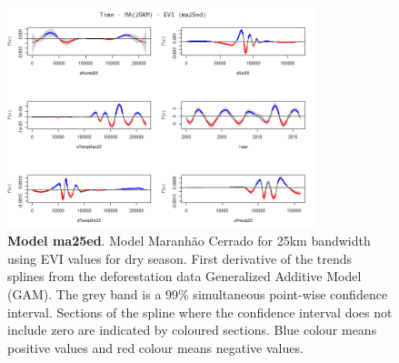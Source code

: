 \begin{table}

\begin{figure}[H]
 \centering
        \centering
        \includegraphics[width=0.8\textwidth]{ma25ed.png} %
        \caption[Model Cerrado Maranhão for 25km bandwidth using EVI values for dry season. First derivative of the trends splines from the deforestation data Generalized Additive Model (GAM)]{\textbf{Model ma25ed}. Model Maranhão Cerrado for 25km bandwidth using EVI values for dry season. First derivative of the trends splines from the deforestation data Generalized Additive Model (GAM). The grey band is a 99\% simultaneous point-wise confidence interval. Sections of the spline where the confidence interval does not include zero are indicated by coloured sections. Blue colour means positive values and red colour means negative values.}
\end{figure}
\end{table}

